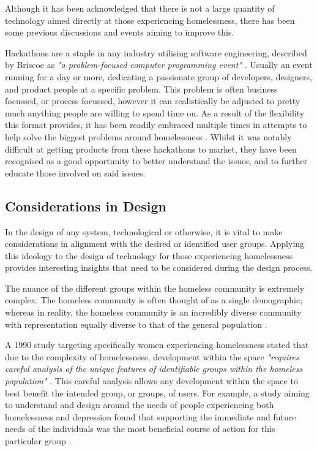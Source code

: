Although it has been acknowledged that there is not a large quantity of technology aimed directly at those experiencing homelessness, there has been some previous discussions and events aiming to improve this.

Hackathons are a staple in any industry utilising software engineering, described by Briscoe as \emph{"a problem-focused computer programming event"} \cite{briscoe2014digital}. Usually an event running for a day or more, dedicating a passionate group of developers, designers, and product people at a specific problem. This problem is often business focussed, or process focussed, however it can realistically be adjusted to pretty much anything people are willing to spend time on. As a result of the flexibility this format provides, it has been readily embraced multiple times in attempts to help solve the biggest problems around homelessness \cite{wilson2019beyond} \cite{linnell2014hack} \cite{pogavcar2016urban}. Whilst it was notably difficult at getting products from these hackathons to market, they have been recognised as a good opportunity to better understand the issues, and to further educate those involved on said issues.

\subsection{Considerations in Design}

In the design of any system, technological or otherwise, it is vital to make considerations in alignment with the desired or identified user groups. Applying this ideology to the design of technology for those experiencing homelessness provides interesting insights that need to be considered during the design process.

The nuance of the different groups within the homeless community is extremely complex. The homeless community is often thought of as a single demographic; whereas in reality, the homeless community is an incredibly diverse community with representation equally diverse to that of the general population \cite{abs2016census}.

A 1990 study targeting specifically women experiencing homelessness stated that due to the complexity of homelessness, development within the space \emph{"requires careful analysis of the unique features of identifiable groups within the homeless population"} \cite{hagen1990designing}. This careful analysis allows any development within the space to best benefit the intended group, or groups, of users. For example, a study aiming to understand and design around the needs of people experiencing both homelessness and depression found that supporting the immediate and future needs of the individuals was the most beneficial course of action for this particular group \cite{belcher1990needs}.

